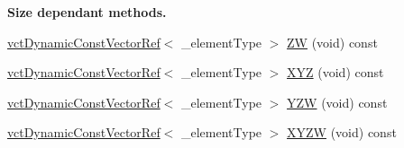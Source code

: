 \begin{Indent}{\bf Size dependant methods.}
\begin{DoxyCompactItemize}
\item 
\hyperlink{classvct_dynamic_const_vector_ref}{vct\+Dynamic\+Const\+Vector\+Ref}$<$ \+\_\+element\+Type $>$ \hyperlink{classvct_dynamic_const_vector_base_abb52e08becc1faf8a447a89e8b19996b}{Z\+W} (void) const 
\item 
\hyperlink{classvct_dynamic_const_vector_ref}{vct\+Dynamic\+Const\+Vector\+Ref}$<$ \+\_\+element\+Type $>$ \hyperlink{classvct_dynamic_const_vector_base_a736496b00730902ffac7167f6ded6c59}{X\+Y\+Z} (void) const 
\item 
\hyperlink{classvct_dynamic_const_vector_ref}{vct\+Dynamic\+Const\+Vector\+Ref}$<$ \+\_\+element\+Type $>$ \hyperlink{classvct_dynamic_const_vector_base_a1d0f6385af081da4af06bac3facd3063}{Y\+Z\+W} (void) const 
\item 
\hyperlink{classvct_dynamic_const_vector_ref}{vct\+Dynamic\+Const\+Vector\+Ref}$<$ \+\_\+element\+Type $>$ \hyperlink{classvct_dynamic_const_vector_base_ade777ffc32d638b381fd953c0b76fac9}{X\+Y\+Z\+W} (void) const 
\end{DoxyCompactItemize}
\end{Indent}
